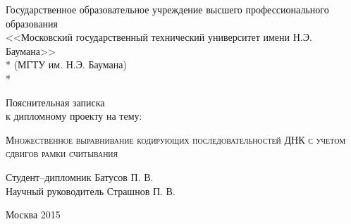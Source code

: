 \begin{titlepage}
\newpage

\begin{center}
Государственное образовательное учреждение высшего профессионального образования \\
\vspace{1cm}
\Large<<Московский государственный технический университет имени Н.Э. Баумана>> \\*
(МГТУ им. Н.Э. Баумана) \\*
\hrulefill
\end{center}


\vspace{8em}

\begin{center}
\Large Пояснительная записка \\ к дипломному проекту на тему:
\end{center}

\vspace{2.0em}

\begin{center}
	\Large
\textsc{Множественное выравнивание кодирующих последовательностей ДНК с учетом сдвигов рамки считывания}
\end{center}

\vspace{6em}

\begin{flushleft}
Студент--дипломник \hrulefill Батусов П. В. \\
\vspace{1.5em}
Научный руководитель \hrulefill Страшнов П. В.\\
\vspace{1.5em}
\end{flushleft}

\vspace{\fill}

\begin{center}
Москва 2015
\end{center}

\end{titlepage}